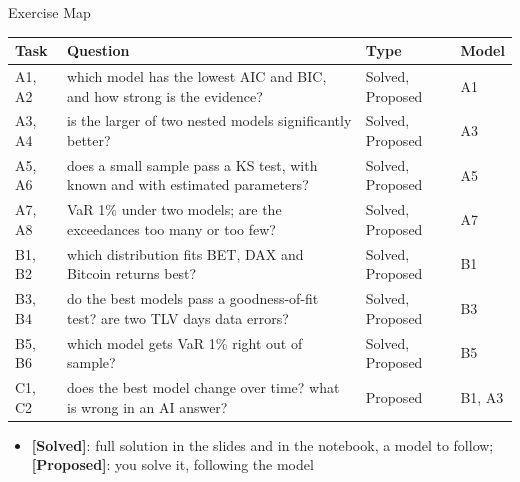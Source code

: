 \begin{frame}{Exercise Map}
\itemsize{\small}
\begin{center}
\footnotesize
\begin{tabular}{>{\raggedright\arraybackslash}p{1.1cm}>{\raggedright\arraybackslash}p{7.5cm}>{\raggedright\arraybackslash}p{1.9cm}>{\raggedright\arraybackslash}p{1.4cm}}
\toprule
\textbf{Task} & \textbf{Question} & \textbf{Type} & \textbf{Model} \\
\midrule
A1, A2 & which model has the lowest AIC and BIC, and how strong is the evidence? & Solved, Proposed & A1 \\
A3, A4 & is the larger of two nested models significantly better? & Solved, Proposed & A3 \\
A5, A6 & does a small sample pass a KS test, with known and with estimated parameters? & Solved, Proposed & A5 \\
A7, A8 & VaR 1\% under two models; are the exceedances too many or too few? & Solved, Proposed & A7 \\
B1, B2 & which distribution fits BET, DAX and Bitcoin returns best? & Solved, Proposed & B1 \\
B3, B4 & do the best models pass a goodness-of-fit test? are two TLV days data errors? & Solved, Proposed & B3 \\
B5, B6 & which model gets VaR 1\% right out of sample? & Solved, Proposed & B5 \\
C1, C2 & does the best model change over time? what is wrong in an AI answer? & Proposed & B1, A3 \\
\bottomrule
\end{tabular}
\end{center}
\begin{itemize}
    \item \textbf{[Solved]}: full solution in the slides and in the notebook, a model to follow; \textbf{[Proposed]}: you solve it, following the model
\end{itemize}
\end{frame}

